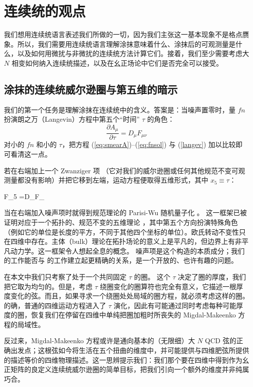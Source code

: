 \section{连续统的观点}

我们想用连续统语言表述我们所做的一切，因为我们主张这一基本现象不是格点赝象。所以，我们需要用连续统语言理解涂抹意味着什么、涂抹后的可观测量是什么，以及如何用微扰与非微扰的连续统方法计算它们。接着，我们至少需要考虑大 $N$ 相变如何纳入连续统描述，以及在幺正场论中它们是否完全可以接受。

\subsection{涂抹的连续统威尔逊圈与第五维的暗示}

我们的第一个任务是理解涂抹在连续统中的含义。答案是：当噪声置零时，量 $f n$ 扮演朗之万（Langevin）方程中第五个``时间'' $\tau$ 的角色：
\begin{equation}
\frac{\partial A_\mu}{\partial\tau} =D_\mu F_{\mu\nu}
\label{langev}
\end{equation}
对小的 $f n$ 和小的 $\tau$，把方程 (\ref{eq:smearA})--(\ref{eq:fnsol}) 与 (\ref{langev}) 加以比较即可看清这一点。

若在右端加上一个 Zwanziger 项 \cite{zwa135}（它对我们的威尔逊圈或任何其他规范不变可观测量都没有影响）并把它移到左端，运动方程便取得五维形式，其中 $x_5\equiv
\tau$：

\be
F_{5\nu} =D_\mu F_{\mu\nu} \ee


当在右端加入噪声项时就得到规范理论的 Parisi-Wu 随机量子化 \cite{stoch13}。
这一框架已被证明对应于一个拓扑的、规范不变的五维理论 \cite{balzwa14}，其中第五个方向扮演特殊角色（例如它的单位是长度的平方，不同于其他四个坐标的单位）。欧氏转动不变性只在四维中存在。主体（bulk）理论在拓扑场论的意义上是平凡的，但边界上有非平凡动力学。这一框架令人想起全息的概念。
噪声项是这个构造的本质成分；我们的工作能否与 \cite{balzwa14} 的工作建立起更精确的关系，是一个开放的、也许有趣的问题。

在本文中我们只考察了处于一个共同固定 $\tau$ 的圈。
这个 $\tau$ 决定了圈的厚度，我们把它取为均匀的。但是，考虑 $\tau$ 绕圈变化的圈算符也完全有意义，它描述一根厚度变化的弦。而且，如果寻求一个绕圈处处局域的圈方程，就必须考虑这样的圈。的确，普通的四维运动方程进入了 $\tau$ 演化，因此有可能通过同时考虑每种可能厚度的圈，恢复我们在停留在四维中单纯把圈加粗时所丧失的 Migdal-Makeenko 方程的局域性。

反过来，Migdal-Makeenko 方程或许是通向基本的（无限细）大
$N$ QCD 弦的正确出发点；这根弦如今将生活在五个扭曲的维度中，并可能提供与四维肥弦所提供的描述等价的四维物理描述。这一思辨提示我们：我们那个要在四维中得到作为幺正矩阵的良定义连续统威尔逊圈的简单目标，把我们引向一个额外的维度并非纯属巧合。


